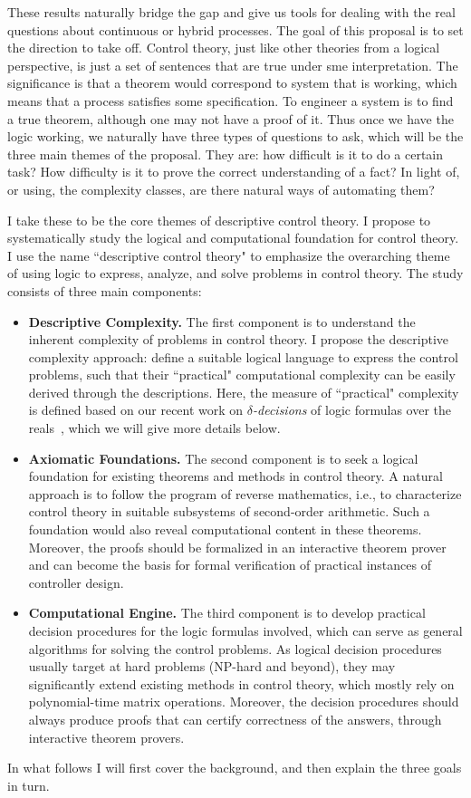 \documentclass[10pt]{article}
\theoremstyle{definition}
\begin{document}
These results naturally bridge the gap and give us tools for dealing with the real questions about continuous or hybrid processes. The goal of this proposal is to set the direction to take off. 
Control theory, just like other theories from a logical perspective, is just a set of sentences that are true under sme interpretation. The significance is that a theorem would correspond to system that is working, which means that a process satisfies some specification. To engineer a system is to find a true theorem, although one may not have a proof of it. Thus once we have the logic working, we naturally have three types of questions to ask, which will be the three main themes of the proposal. They are: how difficult is it to do a certain task? How difficulty is it to prove the correct understanding of a fact? In light of, or using, the complexity classes, are there natural ways of automating them?

I take these to be the core themes of descriptive control theory. I propose to systematically study the logical and computational foundation for control theory. I use the name ``descriptive control theory" to emphasize the overarching theme of using logic to express, analyze, and solve problems in control theory. The study consists of three main components:
\begin{itemize}
\item {\bf Descriptive Complexity. } The first component is to understand the inherent complexity of problems in control theory. I propose the descriptive complexity approach: define a suitable logical language to express the control problems, such that their ``practical" computational complexity can be easily derived through the descriptions. Here, the measure of ``practical" complexity is defined based on our recent work on {\em $\delta$-decisions} of logic formulas over the reals~\cite{DBLP:conf/lics/GaoAC12,DBLP:conf/cade/GaoAC12}, which we will give more details below. 
\item {\bf Axiomatic Foundations. } The second component is to seek a logical foundation for existing theorems and methods in control theory. A natural approach is to follow the program of reverse mathematics, i.e., to characterize control theory in suitable subsystems of second-order arithmetic. Such a foundation would also reveal computational content in these theorems. Moreover, the proofs should be formalized in an interactive theorem prover and can become the basis for formal verification of practical instances of controller design. 
\item {\bf Computational Engine.} The third component is to develop practical decision procedures for the logic formulas involved, which can serve as general algorithms for solving the control problems. As logical decision procedures usually target at hard problems (NP-hard and beyond), they may significantly extend existing methods in control theory, which mostly rely on polynomial-time matrix operations. Moreover, the decision procedures should always produce proofs that can certify correctness of the answers, through interactive theorem provers. 
\end{itemize}
In what follows I will first cover the background, and then explain the three goals in turn. 
\end{document}
